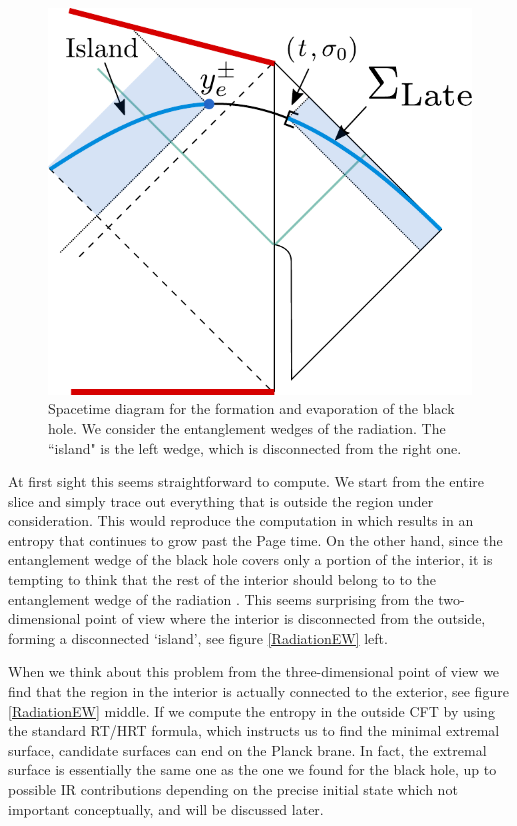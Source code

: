 \documentclass[11pt]{article}
\begin{document}
\begin{figure}[ht]
    \begin{center}
    \includegraphics[scale=.5]{Figures/latetimeslicerad}
    \end{center}
    \caption{ Spacetime diagram for the formation and evaporation of the black hole. We consider the entanglement wedges of the radiation. The ``island" is the left wedge, which is disconnected from the right one. }
    \label{latetimeslicerad}
\end{figure}

At first sight this seems straightforward to compute. 
We start from the entire slice and simply trace out everything that is outside the region under consideration. 
This would reproduce the computation in \cite{Hawking:1976ra} which results in an entropy that continues to grow past the Page time.
On the other hand, since the entanglement wedge of the black hole covers only a portion of the interior, it is tempting to think that the rest of the interior should belong to to the entanglement wedge of the radiation \cite{Penington:2019npb, Almheiri:2019psf,Hayden:2018khn}. 
This seems surprising from the two-dimensional point of view where the interior is disconnected from the outside, forming a disconnected  `island', see figure \ref{RadiationEW} left. 
  
When we think about this problem from the three-dimensional point of view we find that the region in the interior is actually connected to the exterior, see figure \ref{RadiationEW} middle. 
If we compute the entropy in the outside CFT by using the standard RT/HRT formula, which instructs us to find the minimal extremal surface, candidate surfaces can end on the Planck brane.
In fact, the extremal surface is essentially the same one as the one we found for the black hole, up to possible IR contributions depending on the precise initial state which not important conceptually, and will be discussed later.
  
\end{document}
